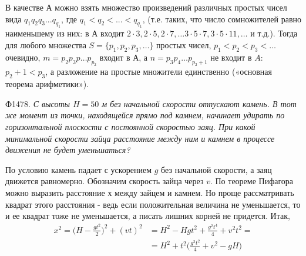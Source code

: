\begin{multicols}{2}
В качестве А можно взять множество произведений различных простых чисел вида $q_1q_2q_3...q_{q_1}$, где $q_1<q_2<...<q_{q_1}$, (т.е. таких, что число сомножителей равно наименьшему из них: в $А$ входит $2 \cdot 3, 2 \cdot 5, 2\cdot 7,… 3 \cdot 5 \cdot 7, 3 \cdot 5 \cdot 11,…$ и т.д.). Тогда для любого множества $S=\{p_1, p_2, p_3, …\}$ простых чисел, $p_1 < p_2 < p_3 < …$ очевидно, $m=p_2p_3p … p_{p_2}$ входит в $А$, а $n=p_3p_4 … p_{p_2+1}$ не входит в $A$: $p_2 + 1 <  p_3$, а разложение на простые множители единственно («основная теорема арифметики»).\\\par
Ф1478. \textit{С высоты $H = 50$ м без начальной скорости отпускают камень. В тот же момент из точки, находящейся прямо под камнем, начинает удирать по горизонтальной плоскости с постоянной скоростью заяц. При какой минимальной скорости зайца расстояние между ним и камнем в процессе движения не будет уменьшаться?}\\\par
По условию камень падает с ускорением $g$ без начальной скорости, а заяц движется равномерно. Обозначим скорость зайца через $v$. По теореме Пифагора можно выразить расстояние $х$ между зайцем и камнем. Но проще рассматривать квадрат этого расстояния - ведь если положительная величина не уменьшается, то и ее квадрат тоже не уменьшается, а писать лишних корней не придется. Итак,
\begin{align*}
x^2 = \bigg(H - \frac{gt^2}{2}\bigg)^2 + (vt)^2 &= H^2 - Hgt^2 + \frac{g^2t^4}{4} + v^2t^2 = \\
&= H^2 + t^2\bigg(\frac{g^2t^2}{4} + v^2 - gH \bigg)
\end{align*}
    
\end{multicols}

%

